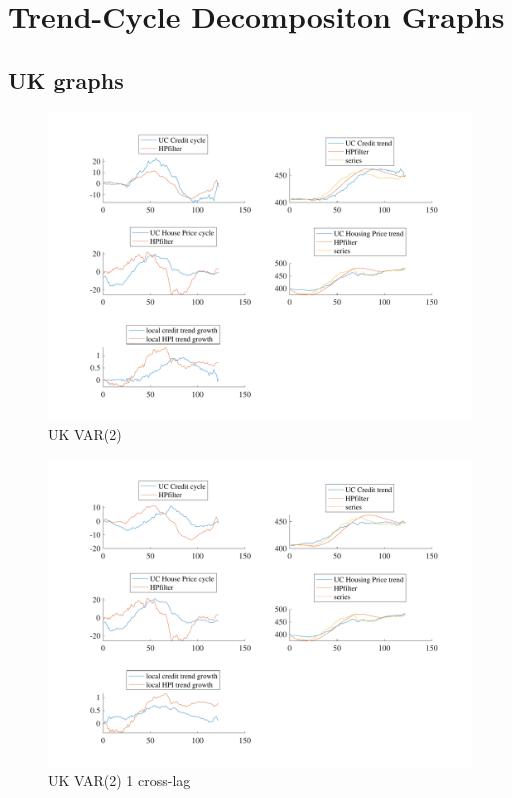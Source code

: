 \documentclass[
  12pt,
]{article}
\begin{document}
\clearpage

\hypertarget{trend-cycle-decompositon-graphs}{%
\section{Trend-Cycle Decompositon Graphs}\label{trend-cycle-decompositon-graphs}}

\hypertarget{uk-graphs}{%
\subsection{UK graphs}\label{uk-graphs}}

\begin{figure}

{\centering \includegraphics[width=0.85\linewidth]{../../Regression/Bayesian_UC_VAR2_drift/OutputData/cycles_UK} 

}

\caption{UK VAR(2)}\label{fig:unnamed-chunk-3}
\end{figure}

\begin{figure}

{\centering \includegraphics[width=0.85\linewidth]{../../Regression/Bayesian_UC_VAR2_drift_Crosscycle1lag/OutputData/cycles_UK} 

}

\caption{UK VAR(2) 1 cross-lag}\label{fig:unnamed-chunk-4}
\end{figure}
\end{document}
